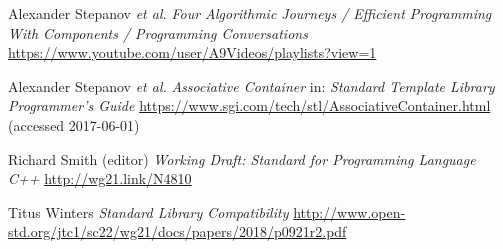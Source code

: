 \documentclass[11pt]{article}
\begin{document}
\begin{thebibliography}{9}
  Alexander Stepanov \emph{et al.}\newline
  \emph{Four Algorithmic Journeys / Efficient Programming With Components /
    Programming Conversations}\newline
  \url{https://www.youtube.com/user/A9Videos/playlists?view=1}

  Alexander Stepanov \emph{et al.}\newline
  \emph{Associative Container}\newline
  in: \emph{Standard Template Library Programmer's Guide}\newline
  \url{https://www.sgi.com/tech/stl/AssociativeContainer.html} (accessed 2017-06-01)

  Richard Smith (editor)\newline
  \emph{Working Draft: Standard for Programming Language C++}\newline
  \url{http://wg21.link/N4810}

 Titus Winters\newline
  \emph{Standard Library Compatibility}\newline
  \url{http://www.open-std.org/jtc1/sc22/wg21/docs/papers/2018/p0921r2.pdf}
\end{thebibliography}
\end{document}
